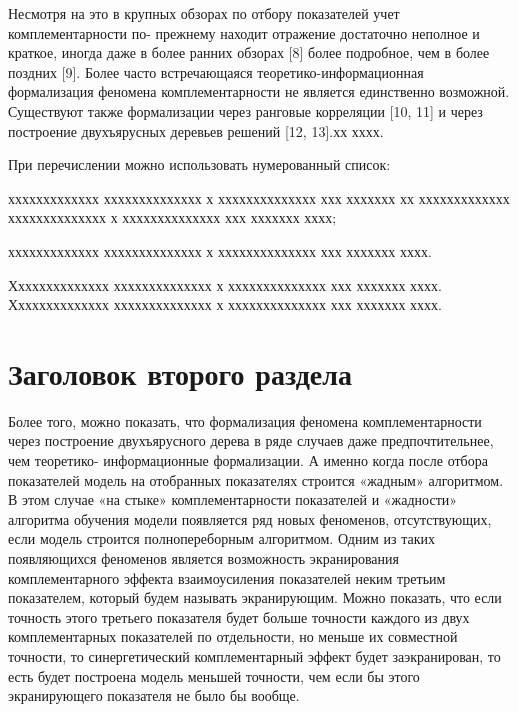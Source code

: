 \documentclass[12pt]{a&t}
\begin{document}
Несмотря на это в крупных обзорах по отбору показателей учет комплементарности по- прежнему находит отражение достаточно неполное и краткое, иногда даже в более ранних обзорах [8] более подробное, чем в более поздних [9].
Более часто встречающаяся теоретико-информационная формализация феномена комплементарности не является единственно возможной. Существуют также формализации через ранговые корреляции [10, 11] и через построение двухъярусных деревьев решений [12, 13].хх хххх.

При перечислении можно использовать нумерованный список:
\begin{enumlist} %
\item
ххххххххххххх хххххххххххххх х хххххххххххххх ххх ххххххх хх
ххххххххххххх хххххххххххххх х хххххххххххххх ххх ххххххх хххх;

\item
ххххххххххххх хххххххххххххх х хххххххххххххх ххх ххххххх хххх.
\end{enumlist}

Хххххххххххххх хххххххххххххх х хххххххххххххх ххх ххххххх хххх.
Хххххххххххххх хххххххххххххх х хххххххххххххх ххх ххххххх хххх.


\section{Заголовок второго раздела}

Более того, можно показать, что формализация феномена комплементарности через построение двухъярусного дерева в ряде случаев даже предпочтительнее, чем теоретико- информационные формализации. А именно когда после отбора показателей модель на отобранных показателях строится «жадным» алгоритмом. В этом случае «на стыке» комплементарности показателей и «жадности» алгоритма обучения модели появляется ряд новых феноменов, отсутствующих, если модель строится полнопереборным алгоритмом. Одним из таких появляющихся феноменов является возможность экранирования комплементарного эффекта взаимоусиления показателей неким третьим показателем, который будем называть экранирующим. Можно показать, что если точность этого третьего показателя будет больше точности каждого из двух комплементарных показателей по отдельности, но меньше их совместной точности, то синергетический комплементарный эффект будет заэкранирован, то есть будет построена модель меньшей точности, чем если бы этого экранирующего показателя не было бы вообще.
\end{document}
